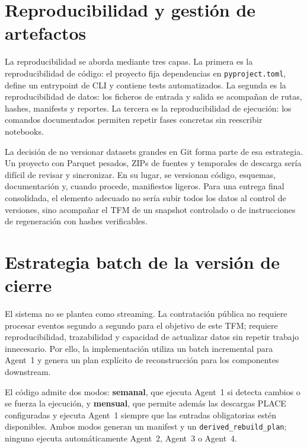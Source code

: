 \documentclass[11pt,a4paper,spanish]{book}
\numberwithin{equation}{chapter}
\numberwithin{figure}{chapter}
\begin{document}
\section{Reproducibilidad y gesti{\'o}n de artefactos}
\label{sec:reproducibilidad_gestion_artefactos}

La reproducibilidad se aborda mediante tres capas. La primera es la reproducibilidad de c{\'o}digo:
el proyecto fija dependencias en \texttt{pyproject.toml}, define un entrypoint de CLI y contiene
tests automatizados. La segunda es la reproducibilidad de datos: los ficheros de entrada y salida
se acompa{\~n}an de rutas, hashes, manifests y reportes. La tercera es la reproducibilidad de
ejecuci{\'o}n: los comandos documentados permiten repetir fases concretas sin reescribir notebooks.

La decisi{\'o}n de no versionar datasets grandes en Git forma parte de esa estrategia. Un proyecto
con Parquet pesados, ZIPs de fuentes y temporales de descarga ser{\'i}a dif{\'i}cil de revisar y
sincronizar. En su lugar, se versionan c{\'o}digo, esquemas, documentaci{\'o}n y, cuando procede,
manifiestos ligeros. Para una entrega final consolidada, el elemento adecuado no ser{\'i}a subir todos
los datos al control de versiones, sino acompa{\~n}ar el TFM de un snapshot controlado o de instrucciones de
regeneraci{\'o}n con hashes verificables.

\section{Estrategia batch de la versi{\'o}n de cierre}
\label{sec:estrategia_batch_cierre}

El sistema no se plantea como streaming. La contrataci{\'o}n p{\'u}blica no requiere procesar eventos
segundo a segundo para el objetivo de este TFM; requiere reproducibilidad, trazabilidad y capacidad
de actualizar datos sin repetir trabajo innecesario. Por ello, la implementaci{\'o}n utiliza un batch
incremental para Agent~1 y genera un plan expl{\'i}cito de reconstrucci{\'o}n para los componentes
downstream.

El c{\'o}digo admite dos modos: \textbf{semanal}, que ejecuta Agent~1 si detecta cambios o se fuerza la
ejecuci{\'o}n, y \textbf{mensual}, que permite adem{\'a}s las descargas PLACE configuradas y ejecuta
Agent~1 siempre que las entradas obligatorias est{\'e}n disponibles. Ambos modos generan un manifest
y un \texttt{derived\_rebuild\_plan}; ninguno ejecuta autom{\'a}ticamente Agent~2, Agent~3 o Agent~4.
\end{document}
